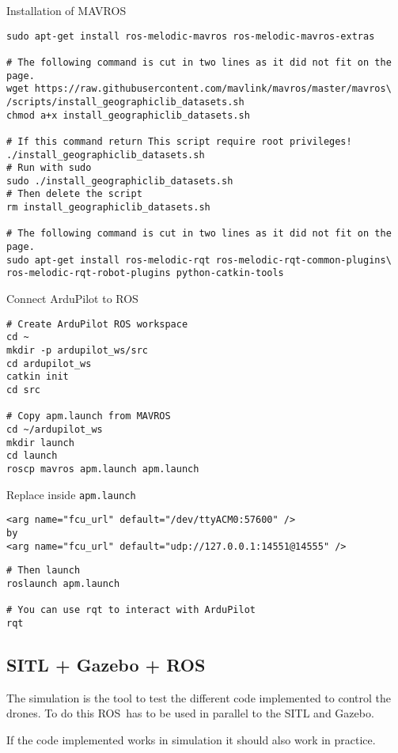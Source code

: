 Installation of MAVROS \cite{ardupilot_install_mavros}
\begin{verbatim}
sudo apt-get install ros-melodic-mavros ros-melodic-mavros-extras

# The following command is cut in two lines as it did not fit on the page.
wget https://raw.githubusercontent.com/mavlink/mavros/master/mavros\
/scripts/install_geographiclib_datasets.sh
chmod a+x install_geographiclib_datasets.sh

# If this command return This script require root privileges!
./install_geographiclib_datasets.sh
# Run with sudo
sudo ./install_geographiclib_datasets.sh
# Then delete the script
rm install_geographiclib_datasets.sh

# The following command is cut in two lines as it did not fit on the page.
sudo apt-get install ros-melodic-rqt ros-melodic-rqt-common-plugins\
ros-melodic-rqt-robot-plugins python-catkin-tools
\end{verbatim}

Connect ArduPilot to ROS \cite{ardupilot_ros_sitl}
\begin{verbatim}
# Create ArduPilot ROS workspace
cd ~
mkdir -p ardupilot_ws/src
cd ardupilot_ws
catkin init
cd src

# Copy apm.launch from MAVROS
cd ~/ardupilot_ws
mkdir launch
cd launch
roscp mavros apm.launch apm.launch
            \end{verbatim}

Replace inside \texttt{apm.launch}
\begin{verbatim}
<arg name="fcu_url" default="/dev/ttyACM0:57600" />
by
<arg name="fcu_url" default="udp://127.0.0.1:14551@14555" />
            \end{verbatim}

\begin{verbatim}
# Then launch
roslaunch apm.launch

# You can use rqt to interact with ArduPilot
rqt
            \end{verbatim}

\subsection{SITL + Gazebo + ROS}
The simulation is the tool to test the different code implemented to control the drones.
To do this ROS has to be used in parallel to the SITL and Gazebo.

If the code implemented works in simulation it should also work in practice.

